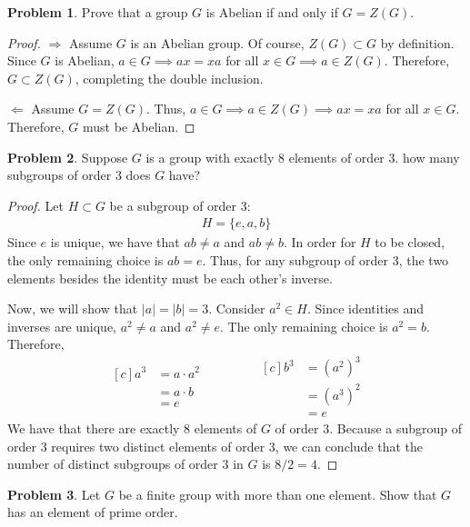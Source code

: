 \documentclass[12pt,reqno]{article}
\theoremstyle{plain}
\theoremstyle{definition}
\newtheorem{problem}{Problem}
\begin{document}
\newpage


\begin{problem} 
    Prove that a group $G$ is Abelian if and only if $G = Z(G)$.
\end{problem}

\begin{proof}
    \(\Rightarrow\) Assume \(G\) is an Abelian group. Of course, \(Z(G)\subset G\) by definition. Since 
    \(G\) is Abelian, \(a\in G\implies ax=xa\) for all \(x\in G\implies a\in Z(G)\). Therefore, \(G \subset Z(G)\), completing the double inclusion.

    \(\Leftarrow\) Assume \(G = Z(G)\). Thus, \(a\in G\implies a\in Z(G)\implies ax=xa\) for all \(x\in G\). 
    Therefore, \(G\) must be Abelian.
\end{proof}

\newpage


\begin{problem}
    Suppose $G$ is a group with exactly 8 elements of order $3$. how many subgroups of order $3$ does $G$ have?
\end{problem}

\begin{proof}
    Let \(H\subset G\) be a subgroup of order 3:
    \begin{align*}
        H = \{e, a, b\}
    \end{align*}
    Since \(e\) is unique, we have that \(ab\neq a\) and \(ab\neq b\). In order for \(H\) to be closed, 
    the only remaining choice is \(ab = e\). Thus, for any subgroup of order \(3\), the two elements besides
    the identity must be each other's inverse.

    Now, we will show that \(|a|=|b|=3\). Consider \(a^2\in H\). Since identities and inverses are unique,
    \(a^2\neq a\) and \(a^2\neq e\). The only remaining choice is \(a^2=b\). Therefore,
    \begin{equation*}
        \begin{aligned}[c]
            a^3 &= a \cdot a^2 \\
            &= a \cdot b\\
            &= e
        \end{aligned}
        \qquad\qquad
        \begin{aligned}[c]
            b^3 &= (a^2)^3\\
            &= (a^3)^2\\
            &= e
        \end{aligned}
    \end{equation*}
    We have that there are exactly \(8\) elements of \(G\) of order \(3\). Because a subgroup of order \(3\) 
    requires two distinct elements of order \(3\), we can conclude that the number of distinct subgroups of 
    order \(3\) in \(G\) is \(8 / 2 = 4\).
\end{proof}

\newpage


\begin{problem} 
    Let $G$ be a finite group with more than one element. Show that $G$ has an element of prime order.
\end{problem}
\end{document}
